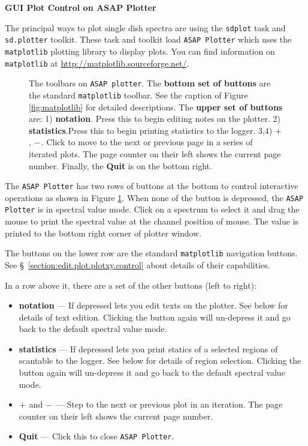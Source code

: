\bigskip
{\bf GUI Plot Control on ASAP Plotter}

The principal ways to plot single dish spectra are using 
the {\tt sdplot} task and {\tt sd.plotter} toolkit. 
These task and toolkit load {\tt ASAP Plotter} which uses 
the {\tt matplotlib} plotting library to display plots. 
You can find information on {\tt matplotlib} at
\url{http://matplotlib.sourceforge.net/}.

\begin{figure}[h!]
\begin{center}
\caption{\label{fig:sdplot_toolbar}
  The toolbars on {\tt ASAP plotter}.
  The {\bf bottom set of buttons} are the standard {\tt matplotlib} toolbar. 
  See the caption of Figure \ref{fig:matplotlib} for detailed descriptions.
  The {\bf upper set of buttons} are:
  1) {\bf notation}. Press this to begin editing notes on the plotter. 
  2) {\bf statistics}.Press this to begin printing statistics to the logger.
  3,4) $ {\bf +} $, $ {\bf -} $. Click to move to the next or previous page in a series 
  of iterated plots. The page counter on their left shows the current page 
  number. Finally, the {\bf Quit} is on the bottom right.}
\hrulefill
\end{center}
\end{figure}

The {\tt ASAP Plotter} has two rows of buttons at the bottom to 
control interactive operations as shown in Figure \ref{fig:sdplot_toolbar}. 
When none of the button is depressed, the {\tt ASAP Plotter} is in spectral 
value mode. Click on a spectrum to select it and drag the mouse to print 
the spectral value at the channel position of mouse. The value is printed 
to the bottom right corner of plotter window.

The buttons on the lower row are the standard 
{\tt matplotlib} navigation buttons. 
See \S~\ref{section:edit.plot.plotxy.control} about details of their 
capabilities.

In a row above it, there are a set of the other buttons (left to right):
\begin{itemize}
\item {\bf notation} --- If depressed lets you edit texts on the plotter. 
  See below for details of text edition.
  Clicking the button again will un-depress it and go back 
  to the default spectral value mode.
\item {\bf statistics} --- If depressed lets you print statics of a 
  selected regions of scantable to the logger.
  See below for details of region selection.
  Clicking the button again will un-depress it and go back 
  to the default spectral value mode.
\item $ {\bf +} $ and $ {\bf -} $ --- Step to the next or previous plot 
  in an iteration. The page counter on their left shows the current page
  number.
\item {\bf Quit} --- Click this to close {\tt ASAP Plotter}.
\end {itemize}

